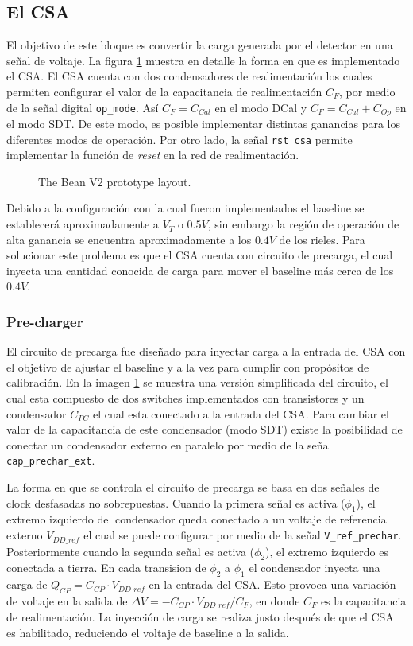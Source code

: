 \documentclass[11pt,letterpaper,spanish]{article}
\begin{document}
\subsection{El CSA}

El objetivo de este bloque es convertir la carga generada por el detector en una señal de voltaje. La figura \ref{csa} muestra en detalle la forma en que es implementado el CSA. El CSA cuenta con dos condensadores de realimentación los cuales permiten configurar el valor de la capacitancia de realimentación $C_F$, por medio de la señal digital \verb+op_mode+. Así $C_F= C_{Cal}$ en el modo DCal y $C_F= C_{Cal}+ C_{Op}$ en el modo SDT. De este modo, es posible implementar distintas ganancias para los diferentes modos de operación. Por otro lado, la señal \verb+rst_csa+ permite implementar la función de \textit{reset} en la red de realimentación.

\begin{figure}[!h]
	\centering
	
	\caption{\label{csa}The Bean V2 prototype layout.}
\end{figure}

 Debido a la configuración con la cual fueron implementados el baseline se establecerá aproximadamente a $V_T$ o $0.5V$, sin embargo la región de operación de alta ganancia se encuentra aproximadamente a los $0.4V$ de los rieles. Para solucionar este problema es que el CSA cuenta con circuito de precarga, el cual inyecta una cantidad conocida de carga para mover el baseline más cerca de los $0.4V$.

\subsubsection{ Pre-charger}
El circuito de precarga fue diseñado para inyectar carga a la entrada del CSA con el objetivo de ajustar el baseline y a la vez para cumplir con propósitos de calibración.
 En la imagen \ref{csa} se muestra una versión simplificada del circuito, el cual esta compuesto de dos switches implementados con transistores y un condensador $C_{PC}$ el cual esta conectado a la entrada del CSA. Para cambiar el valor de la capacitancia de este condensador (modo SDT) existe la posibilidad de conectar un condensador externo en paralelo por medio de la señal \verb+cap_prechar_ext+.
 
 
La forma en que se controla el circuito de precarga se basa en dos señales de clock desfasadas no sobrepuestas. Cuando la primera señal es activa ($\phi_1$), el extremo izquierdo del condensador queda conectado a un voltaje de referencia externo $V_{DD\_ref}$ el cual se puede configurar por medio de la señal \verb+V_ref_prechar+. Posteriormente cuando la segunda señal es activa ($\phi_2$), el extremo izquierdo es conectada a tierra. En cada transision de $\phi_2$ a $\phi_1$ el condensador inyecta una carga de $Q_{CP}=C_{CP} \cdot V_{DD\_ref}$ en la entrada del CSA. Esto provoca una variación de voltaje en la salida de $\Delta V =-C_{CP} \cdot V_{DD\_ref}/C_F$, en donde $C_F$ es la capacitancia de realimentación. La inyección de carga se realiza justo después de que el CSA es habilitado, reduciendo el voltaje de baseline a la salida. 
\end{document}
